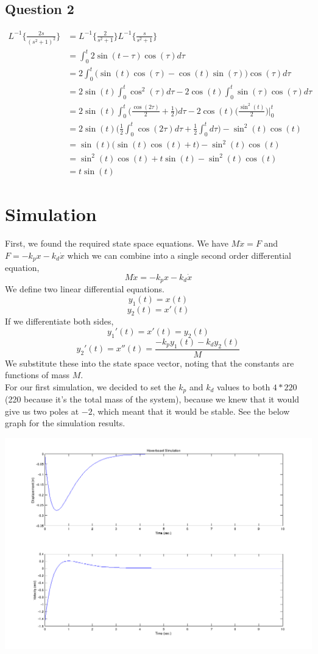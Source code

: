 \documentclass[titlepage]{article}
\begin{document}
\subsection*{Question 2}
\begin{align*}
    L^{-1}\{\frac{2s}{(s^2+1)^2}\} &= L^{-1}\{\frac{2}{s^2+1}\}L^{-1}\{\frac{s}{s^2+1}\} \\
    &= \int_0^t 2\sin(t-\tau)\cos(\tau) d\tau \\
    &= 2 \int_0^t \bigg(\sin(t)\cos(\tau) - \cos(t)\sin(\tau)\bigg)\cos(\tau) d\tau \\
    &= 2 \sin(t) \int_0^t \cos^2(\tau) d\tau - 2\cos(t)\int_0^t\sin(\tau)\cos(\tau) d\tau \\
    &= 2 \sin(t) \int_0^t \bigg(\frac{\cos(2\tau)}{2} + \frac{1}{2}\bigg) d\tau - 2\cos(t)\bigg(\frac{\sin^2(t)}{2}\bigg)\bigg|_0^t \\
    &= 2 \sin(t) \bigg( \frac{1}{2}\int_0^t\cos(2\tau)d\tau +  \frac{1}{2}\int_0^t d\tau\bigg) - \sin^2(t)\cos(t) \\
    &= \sin(t) \bigg(\sin(t)\cos(t) + t\bigg) - \sin^2(t)\cos(t) \\
    &= \sin^2(t)\cos(t) + t\sin(t) - \sin^2(t)\cos(t) \\
    &= t\sin(t)
\end{align*}

\section*{Simulation}

First, we found the required state space equations. We have $M\ddot{x}=F$ and $F=-k_px-k_d\dot{x}$ which we can combine into a single second order differential equation, $$M\ddot{x}=-k_px-k_d\dot{x}$$
We define two linear differential equations.
$$y_1(t) = x(t)$$
$$y_2(t) = x'(t)$$
If we differentiate both sides,
$$y_1'(t) = x'(t) = y_2(t)$$
$$y_2'(t) = x''(t) = \frac{-k_py_1(t) - k_dy_2(t)}{M}$$
We substitute these into the state space vector, noting that the constants  are functions of mass $M$. \\
For our first simulation, we decided to set the $k_p$ and $k_d$ values to both $4*220$ (220 because it's the total mass of the system),
because we knew that it would give us two poles at $-2$, which meant that it would be stable.
See the below graph for the simulation results.

\includegraphics[scale=0.5]{k_pk_d4m.png}
\end{document}
